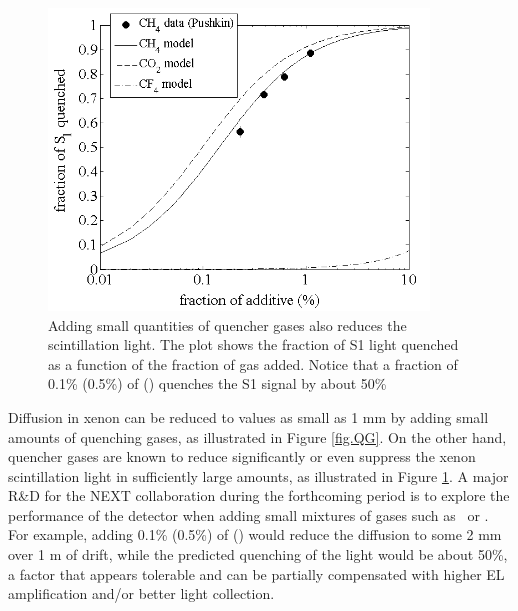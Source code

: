 \begin{figure}
\centering
\includegraphics[width=0.90\textwidth]{img2/QF.png}
\caption{\small Adding small quantities of quencher gases also reduces the scintillation light. The plot shows the fraction of S1 light quenched as a function of the fraction of gas added. Notice that a fraction of 0.1\% (0.5\%) of \COT (\CHF) quenches the S1 signal by about 50\% } \label{fig.QF}
\end{figure}

Diffusion in xenon can be reduced to values as small as 1 mm by adding small amounts of quenching gases, as illustrated in Figure \ref{fig.QG}. On the other hand, quencher gases are known to reduce significantly or even suppress the xenon scintillation light in sufficiently large amounts, as illustrated in Figure \ref{fig.QF}. A major R\&D for the NEXT collaboration during the forthcoming period is to explore the performance of the detector when adding small  mixtures of gases such as \COT\ or \CHF. For example, adding 0.1\% (0.5\%) of \COT (\CHF) would reduce the diffusion to some 2 mm over 1 m of drift, while the predicted quenching of the light would be about 50\%, a factor that appears tolerable and can be partially compensated with higher EL amplification and/or better light collection. 

